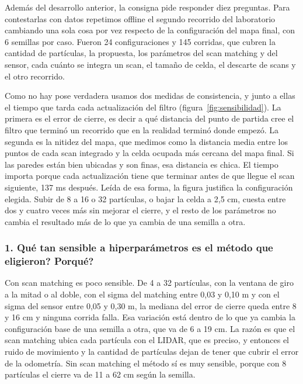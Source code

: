 Además del desarrollo anterior, la consigna pide responder diez preguntas. Para
contestarlas con datos repetimos offline el segundo recorrido del laboratorio
cambiando una sola cosa por vez respecto de la configuración del mapa final,
con 6 semillas por caso. Fueron 24 configuraciones y 145 corridas, que cubren
la cantidad de partículas, la propuesta, los parámetros del scan matching y del
sensor, cada cuánto se integra un scan, el tamaño de celda, el descarte de
scans y el otro recorrido.

Como no hay pose verdadera usamos dos medidas de consistencia, y junto a
ellas el tiempo que tarda cada actualización del filtro
(figura~\ref{fig:sensibilidad}). La primera es el error de cierre, es decir a qué
distancia del punto de partida cree el filtro que terminó un recorrido que en
la realidad terminó donde empezó. La segunda es la nitidez del mapa, que
medimos como la distancia media entre los puntos de cada scan integrado y la
celda ocupada más cercana del mapa final. Si las paredes están bien ubicadas y
son finas, esa distancia es chica. El tiempo importa porque cada actualización
tiene que terminar antes de que llegue el scan siguiente, 137 ms después.
Leída de esa forma, la figura justifica la configuración elegida. Subir de 8 a
16 o 32 partículas, o bajar la celda a 2,5 cm, cuesta entre dos y cuatro veces
más sin mejorar el cierre, y el resto de los parámetros no cambia el resultado
más de lo que ya cambia de una semilla a otra.

\subsubsection*{1. \textquestiondown{}Qué tan sensible a hiperparámetros es el método que eligieron? \textquestiondown{}Porqué?}

Con scan matching es poco sensible. De 4 a 32 partículas, con la ventana de
giro a la mitad o al doble, con el sigma del matching entre 0,03 y 0,10 m y con
el sigma del sensor entre 0,05 y 0,30 m, la mediana del error de cierre queda
entre 8 y 16 cm y ninguna corrida falla. Esa variación está dentro de lo que ya
cambia la configuración base de una semilla a otra, que va de 6 a 19 cm. La
razón es que el scan matching ubica cada partícula con el LIDAR, que es
preciso, y entonces el ruido de movimiento y la cantidad de partículas dejan de
tener que cubrir el error de la odometría. Sin scan matching el método sí es
muy sensible, porque con 8 partículas el cierre va de 11 a 62 cm según la
semilla.

